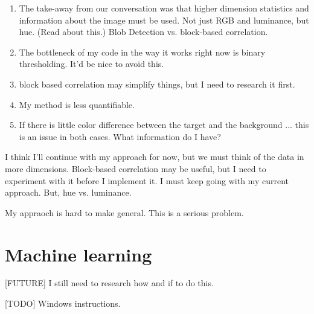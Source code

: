 \documentclass[letter]{article}
\begin{document}
\begin{enumerate}
\item The take-away from our conversation was that higher dimension statistics and information
about the image must be used. Not just RGB and luminance, but hue. (Read about this.) 
Blob Detection vs. block-based correlation.

\item The bottleneck of my code in the way it works right now is binary thresholding. It'd be 
nice to avoid this. 

\item block based correlation may simplify things, but I need to research it first. 

\item My method is less quantifiable. 

\item If there is little color difference between the target and the background ... this is an
issue in both cases. What information do I have? 
\end{enumerate}

I think I'll continue with my approach for now, but we must think of the data in more dimensions. 
Block-based correlation may be useful, but I need to experiment with it before I implement it. 
I must keep going with my current approach. But, hue vs. luminance. 

My appraoch is hard to make general. This is a serious problem.  


\section{Machine learning}
[FUTURE] I still need to research how and if to do this. 

[TODO] Windows instructions.
\end{document}
